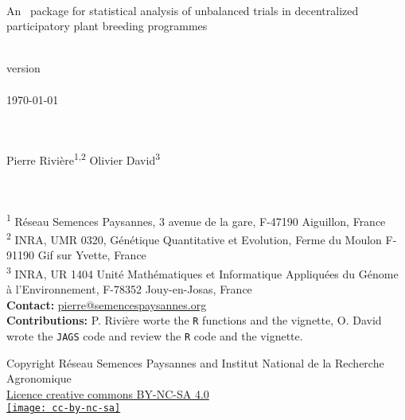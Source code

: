 \pagestyle{empty}
\begin{center}
\Huge{\pack } \\
\Large{An \R~package for statistical analysis of unbalanced trials in decentralized participatory plant breeding programmes}

~\\

version \versionnumber \\

~\\
\today

~\\~\\

Pierre Rivi\`ere\textsuperscript{1,2} \hspace{1cm} Olivier David\textsuperscript{3} \\
~\\~\\ 
\end{center}


\vfill

\noindent\textsuperscript{1} R\'eseau Semences Paysannes, 3 avenue de la gare, F-47190 Aiguillon, France \\ 
\textsuperscript{2} INRA, UMR 0320, Génétique Quantitative et Evolution, Ferme du Moulon F-91190 Gif sur Yvette, France \\
\textsuperscript{3} INRA, UR 1404 Unité Mathématiques et Informatique Appliquées du Génome à l'Environnement, F-78352 Jouy-en-Josas, France \\ 
\textbf{Contact:} \href{mailto:pierre@semencespaysannes.org}{pierre@semencespaysannes.org} \\
\textbf{Contributions:} 
P. Rivière worte the \texttt{R} functions and the vignette,
O. David wrote the \texttt{JAGS} code and review the \texttt{R} code and the vignette.

\vfill

\begin{center}
Copyright Réseau Semences Paysannes and Institut National de la Recherche Agronomique \\
\href{http://creativecommons.org/licenses/by-nc-sa/4.0/}{Licence creative commons BY-NC-SA 4.0} \\
\vspace{.25cm}
\href{http://creativecommons.org/licenses/by-nc-sa/4.0/}{\texttt{[image: cc-by-nc-sa]}}
\end{center}

\vfill

